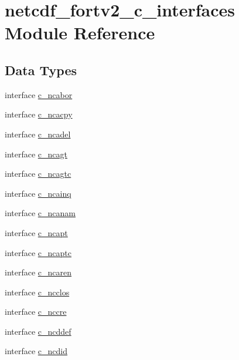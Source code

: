 \hypertarget{namespacenetcdf__fortv2__c__interfaces}{}\section{netcdf\+\_\+fortv2\+\_\+c\+\_\+interfaces Module Reference}
\label{namespacenetcdf__fortv2__c__interfaces}
\subsection*{Data Types}
\begin{DoxyCompactItemize}
\item 
interface \hyperlink{interfacenetcdf__fortv2__c__interfaces_1_1c__ncabor}{c\+\_\+ncabor}
\item 
interface \hyperlink{interfacenetcdf__fortv2__c__interfaces_1_1c__ncacpy}{c\+\_\+ncacpy}
\item 
interface \hyperlink{interfacenetcdf__fortv2__c__interfaces_1_1c__ncadel}{c\+\_\+ncadel}
\item 
interface \hyperlink{interfacenetcdf__fortv2__c__interfaces_1_1c__ncagt}{c\+\_\+ncagt}
\item 
interface \hyperlink{interfacenetcdf__fortv2__c__interfaces_1_1c__ncagtc}{c\+\_\+ncagtc}
\item 
interface \hyperlink{interfacenetcdf__fortv2__c__interfaces_1_1c__ncainq}{c\+\_\+ncainq}
\item 
interface \hyperlink{interfacenetcdf__fortv2__c__interfaces_1_1c__ncanam}{c\+\_\+ncanam}
\item 
interface \hyperlink{interfacenetcdf__fortv2__c__interfaces_1_1c__ncapt}{c\+\_\+ncapt}
\item 
interface \hyperlink{interfacenetcdf__fortv2__c__interfaces_1_1c__ncaptc}{c\+\_\+ncaptc}
\item 
interface \hyperlink{interfacenetcdf__fortv2__c__interfaces_1_1c__ncaren}{c\+\_\+ncaren}
\item 
interface \hyperlink{interfacenetcdf__fortv2__c__interfaces_1_1c__ncclos}{c\+\_\+ncclos}
\item 
interface \hyperlink{interfacenetcdf__fortv2__c__interfaces_1_1c__nccre}{c\+\_\+nccre}
\item 
interface \hyperlink{interfacenetcdf__fortv2__c__interfaces_1_1c__ncddef}{c\+\_\+ncddef}
\item 
interface \hyperlink{interfacenetcdf__fortv2__c__interfaces_1_1c__ncdid}{c\+\_\+ncdid}
\item 

\end{DoxyCompactItemize}
